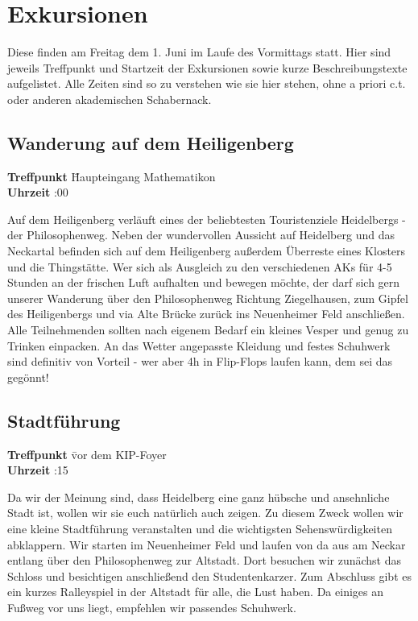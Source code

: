 
\def\hochruecken{\vspace{-6pt}}
\section{Exkursionen}

Diese finden am Freitag dem 1. Juni im Laufe des Vormittags statt.
Hier sind jeweils Treffpunkt und Startzeit der Exkursionen sowie kurze Beschreibungstexte aufgelistet.
Alle Zeiten sind so zu verstehen wie sie hier stehen, ohne a priori c.t. oder anderen akademischen Schabernack.

\hochruecken
\subsection*{Wanderung auf dem Heiligenberg}
\begin{tabbing}
\textbf{Treffpunkt} \quad \quad \quad \= Haupteingang Mathematikon\\
\textbf{Uhrzeit} :00
\end{tabbing}%
\hochruecken
Auf dem Heiligenberg verläuft eines der beliebtesten Touristenziele Heidelbergs - der Philosophenweg. Neben der wundervollen Aussicht auf Heidelberg und das Neckartal befinden sich auf dem Heiligenberg außerdem Überreste eines Klosters und die Thingstätte. Wer sich als Ausgleich zu den verschiedenen AKs für 4-5 Stunden an der frischen Luft aufhalten und bewegen möchte, der darf sich gern unserer Wanderung über den Philosophenweg Richtung Ziegelhausen, zum Gipfel des Heiligenbergs und via Alte Brücke zurück ins Neuenheimer Feld anschließen. Alle Teilnehmenden sollten nach eigenem Bedarf ein kleines Vesper und genug zu Trinken einpacken. An das Wetter angepasste Kleidung und festes Schuhwerk sind definitiv von Vorteil - wer aber 4h in Flip-Flops laufen kann, dem sei das gegönnt! 

\hochruecken
\subsection*{Stadtführung}
\begin{tabbing}
\textbf{Treffpunkt} \quad \quad \quad \= vor dem KIP-Foyer\\
\textbf{Uhrzeit} :15
\end{tabbing}%
\hochruecken
Da wir der Meinung sind, dass Heidelberg eine ganz hübsche und ansehnliche Stadt ist, wollen wir sie euch natürlich auch zeigen. Zu diesem Zweck wollen wir eine kleine Stadtführung veranstalten und die wichtigsten Sehenswürdigkeiten abklappern. Wir starten im  Neuenheimer Feld und laufen von da aus am Neckar entlang über den Philosophenweg zur Altstadt. Dort besuchen wir zunächst das Schloss und besichtigen anschließend den Studentenkarzer. Zum Abschluss gibt es ein kurzes Ralleyspiel in der Altstadt für alle, die Lust haben. Da einiges an Fußweg vor uns liegt, empfehlen wir passendes Schuhwerk. 

